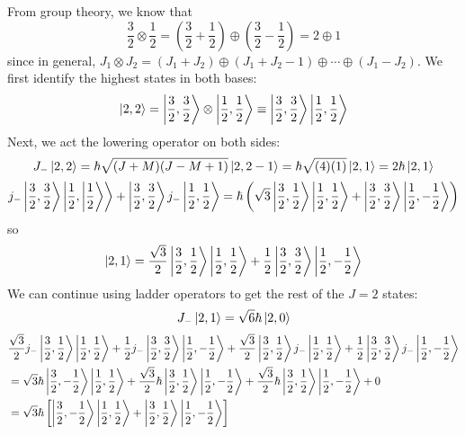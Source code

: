 \documentclass[a4paper,twoside]{article}
\begin{document}
\begin{problem}
    From group theory, we know that
    \begin{equation}
        \frac{3}{2} \otimes \frac{1}{2} = \left( \frac{3}{2} + \frac{1}{2} \right) \oplus \left( \frac{3}{2} - \frac{1}{2} \right) = 2 \oplus 1
    \end{equation}
    since in general, $ J_1 \otimes J_2 = (J_1 + J_2) \oplus (J_1 + J_2 - 1) \oplus \cdots \oplus (J_1 - J_2) $. We first identify the highest states in both bases:
    \begin{equation}
        \ket{2,2} = \ket{\frac{3}{2}, \frac{3}{2}} \otimes\ket{\frac{1}{2}, \frac{1}{2}} \equiv\ket{\frac{3}{2}, \frac{3}{2}}\ket{\frac{1}{2}, \frac{1}{2}}
    \end{equation}
    Next, we act the lowering operator on both sides:
    \begin{equation}
        J_-\ket{2,2} = \hbar \sqrt{(J+M)(J-M+1)}\ket{2, 2-1} = \hbar \sqrt{(4)(1)}\ket{2,1} = 2 \hbar\ket{2,1}
    \end{equation}
    \begin{equation}
        j_-\ket{\frac{3}{2}, \frac{3}{2}}\ket{\frac{1}{2},\ket{\frac{1}{2}}} +\ket{\frac{3}{2}, \frac{3}{2}} j_-\ket{\frac{1}{2}, \frac{1}{2}} = \hbar \left( \sqrt{3}\ket{\frac{3}{2}, \frac{1}{2}}\ket{\frac{1}{2}, \frac{1}{2}} +\ket{\frac{3}{2}, \frac{3}{2}}\ket{\frac{1}{2}, - \frac{1}{2}} \right)
    \end{equation}
    so
    \begin{equation}
        \ket{2,1} = \frac{\sqrt{3}}{2}\ket{\frac{3}{2}, \frac{1}{2}}\ket{\frac{1}{2}, \frac{1}{2}} + \frac{1}{2} \ket{\frac{3}{2}, \frac{3}{2}}\ket{\frac{1}{2}, - \frac{1}{2}}
    \end{equation}
    We can continue using ladder operators to get the rest of the $ J = 2 $ states:
    \begin{equation}
        J_-\ket{2,1} = \sqrt{6} \hbar \ket{2,0}
    \end{equation}
    \begin{align}
        &\frac{\sqrt{3}}{2} j_-\ket{\frac{3}{2}, \frac{1}{2}}\ket{\frac{1}{2}, \frac{1}{2}} + \frac{1}{2} j_-\ket{\frac{3}{2}, \frac{3}{2}}\ket{\frac{1}{2}, - \frac{1}{2}} + \frac{\sqrt{3}}{2}\ket{\frac{3}{2}, \frac{1}{2}}j_-\ket{\frac{1}{2}, \frac{1}{2}} + \frac{1}{2} \ket{\frac{3}{2}, \frac{3}{2}}j_-\ket{\frac{1}{2}, - \frac{1}{2}} \\
        &= \sqrt{3} \hbar \ket{\frac{3}{2}, - \frac{1}{2}} \ket{\frac{1}{2}, \frac{1}{2}} + \frac{\sqrt{3}}{2} \hbar \ket{\frac{3}{2}, \frac{1}{2}}\ket{\frac{1}{2}, - \frac{1}{2}} + \frac{\sqrt{3}}{2} \hbar \ket{\frac{3}{2}, \frac{1}{2}}\ket{\frac{1}{2}, - \frac{1}{2}} + 0 \\
        &= \sqrt{3} \hbar \left[\ket{\frac{3}{2}, - \frac{1}{2}}\ket{\frac{1}{2}, \frac{1}{2}} +\ket{\frac{3}{2}, \frac{1}{2}}\ket{\frac{1}{2}, - \frac{1}{2}} \right]
    \end{align}


\end{problem}
\end{document}
